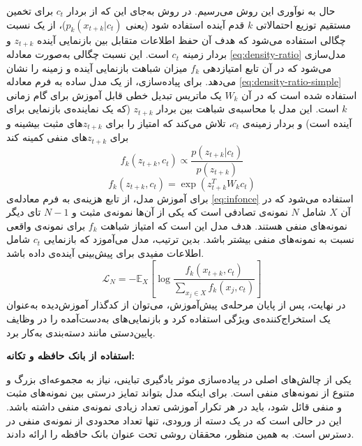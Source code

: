 حال به نوآوری این روش می‌رسیم. در روش 
به‌جای این که از بردار $c_t$
برای تخمین مستقیم توزیع احتمالاتی $k$ قدم آینده استفاده شود
(یعنی $p_k(x_{t+k}|c_t)$)،
از یک نسبت چگالی
استفاده می‌شود که هدف آن حفظ اطلاعات متقابل بین بازنمایی آینده
$z_{t+k}$ و بردار زمینه $c_t$ است.
این نسبت چگالی به‌صورت معادله \ref{eq:density-ratio} مدل‌سازی می‌شود
که در آن تابع امتیازدهی $f_k$
میزان شباهت بازنمایی آینده و زمینه را نشان می‌دهد. برای پیاده‌سازی، از یک مدل ساده به فرم
معادله \ref{eq:density-ratio-simple}
استفاده شده است که در آن $W_k$
یک ماتریس تبدیل خطی قابل آموزش برای گام زمانی $k$ است.
این مدل با محاسبه‌ی شباهت بین بردار
$z_{t+k}$
(که یک نماینده‌ی بازنمایی برای آینده است)
و بردار زمینه‌ی $c_t$،
تلاش می‌کند که امتیاز را برای
$z_{t+k}$های مثبت بیشینه
و برای $z_{t+k}$های منفی کمینه کند
\begin{equation}
\label{eq:density-ratio}
f_k(z_{t+k}, c_t) \propto \frac{p(z_{t+k}|c_t)}{p(z_{t+k})}
\end{equation}
\begin{equation}
\label{eq:density-ratio-simple}
f_k(z_{t+k}, c_t) = \exp \left( z_{t+k}^T W_k c_t \right)
\end{equation}
برای آموزش مدل، از تابع هزینه‌ی
 به فرم معادله‌ی \ref{eq:infonce}
استفاده می‌شود که در آن $X$ شامل $N$
نمونه‌ی تصادفی است که یکی از آن‌ها نمونه‌ی مثبت و $N-1$
تای دیگر نمونه‌های منفی هستند. هدف مدل این است که امتیاز شباهت $f_k$
برای نمونه‌ی واقعی نسبت به نمونه‌های منفی بیشتر باشد. بدین ترتیب، مدل می‌آموزد که بازنمایی $c_t$
شامل اطلاعات مفیدی برای پیش‌بینی آینده‌ی داده باشد.
\begin{equation}
\label{eq:infonce}
\mathcal{L}_N = - \mathbb{E}_X \left[ \log \frac{f_k(x_{t+k}, c_t)}{\sum_{x_j \in X} f_k(x_j, c_t)} \right]
\end{equation}
در نهایت، پس از پایان مرحله‌ی پیش‌‌آموزش، می‌توان از کدگذار آموزش‌دیده به‌عنوان یک استخراج‌کننده‌ی ویژگی استفاده کرد و بازنمایی‌های به‌دست‌آمده را در وظایف پایین‌دستی مانند دسته‌بندی به‌کار برد.\newline

\noindent\textbf{استفاده از بانک حافظه و تکانه:}

یکی از چالش‌های اصلی در پیاده‌سازی موثر یادگیری تباینی، نیاز به مجموعه‌ای بزرگ و متنوع از نمونه‌های منفی است. برای اینکه مدل بتواند تمایز درستی بین نمونه‌های مثبت و منفی قائل شود، باید در هر تکرار آموزشی تعداد زیادی نمونه‌ی منفی داشته باشد. این در حالی است که در یک دسته از ورودی، تنها تعداد محدودی از نمونه‌ی منفی در دسترس است. به همین منظور، محققان روشی تحت عنوان
بانک حافظه\cite{wu2018unsupervised}
را ارائه دادند.


